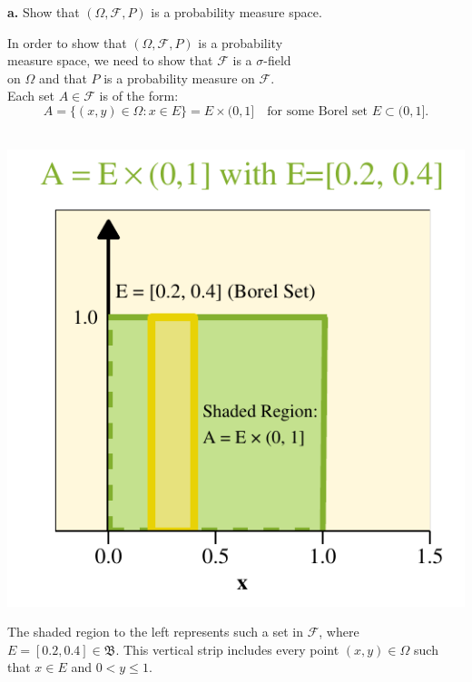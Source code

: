 \textbf{a.} Show that \((\Omega, \mathcal{F}, P)\) is a probability
measure space.

\begin{proofline}
   In order to show that $(\Omega, \mathcal{F}, P)$ is a probability\\[-2pt]
   measure space, we need to show that $\mathcal{F}$ is a $\sigma$-field\\[-2pt]
   on $\Omega$ and that $P$ is a probability measure on $\mathcal{F}$.\\[-5pt]
   
   Each set $A \in \mathcal{F}$ is of the form:
    \[
    A = \{(x, y) \in \Omega : x \in E \} = E \times (0,1] \quad \text{for some Borel set } E \subset (0,1].
    \]
       \\
       

\vspace{-5ex}
\begin{minipage}[t]{0.39\textwidth}
  \vspace{-2ex}
  \includegraphics[width=\linewidth]{selected-square.pdf}
  \vspace{-2ex}
\end{minipage}%
\hfill
\begin{minipage}[t]{0.59\textwidth}

    The shaded region to the left represents such a set in $\mathcal{F}$, where
    $E = [0.2, 0.4] \in \mathfrak{B}$. This vertical strip includes every point
    $(x, y) \in \Omega$ such that $x \in E$ and $0 < y \leq 1$.\\[5pt]


\end{minipage}
\end{proofline}
